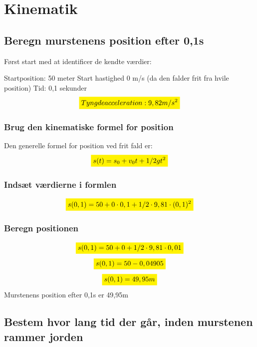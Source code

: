 \section{Kinematik}
\subsection{Beregn murstenens position efter 0,1s}
Først start med at identificer de kendte værdier:

Startposition: 50 meter
Start hastighed 0 m/s (da den falder frit fra hvile position)
Tid: 0,1 sekunder
\begin{equation*}
    \mathcolorbox{yellow}{Tyngdeacceleration: 9,82m/s^{2}}
\end{equation*}


\subsubsection{Brug den kinematiske formel for position}
Den generelle formel for position ved frit fald er:
\begin{equation*}
    \mathcolorbox{yellow}{s(t)=s_0+v_0t+1/2gt^{2}}
\end{equation*}

\subsubsection{Indsæt værdierne i formlen}
\begin{equation*}
    \mathcolorbox{yellow}{s(0,1)=50+0\cdot0,1+1/2\cdot9,81\cdot(0,1)^{2}}
\end{equation*}

\subsubsection{Beregn positionen}
\begin{equation*}
    \mathcolorbox{yellow}{s(0,1)=50+0+1/2\cdot9,81\cdot0,01}
\end{equation*}
\begin{equation*}
    \mathcolorbox{yellow}{s(0,1)=50-0,04905}
\end{equation*}
\begin{equation*}
    \mathcolorbox{yellow}{s(0,1)=49,95m}
\end{equation*}
Murstenens position efter 0,1s er 49,95m

\subsection{Bestem hvor lang tid der går, inden murstenen rammer jorden}

